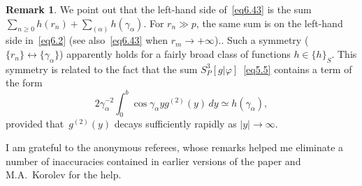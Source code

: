 \documentclass{amsart}
\theoremstyle{plain}
\theoremstyle{definition}
\newtheorem*{remark}{Remark}
\numberwithin{equation}{section}
\begin{document}
\begin{remark}
We point out that the left-hand side of~\eqref{eq6.43} is the sum
$\sum_{n\geqslant 0}h(r_n)+\sum_{(\alpha)}h(\gamma_\alpha)$. For
$r_n \gg p$, the same sum is on the left-hand side
in~\eqref{eq6.2} (see also~\eqref{eq6.43} when $r_{m}\to +\infty$).. Such a symmetry ($\{r_n\}\leftrightarrow
\{\gamma_\alpha\}$) apparently holds for a fairly broad class of
functions $h \in \{h\}_S$. This symmetry is related to the fact
that the sum $S_P^3[g|\varphi]$~\eqref{eq5.5} contains a term of
the form
$$
2\gamma_\alpha^{-2}\int_0^b \cos\gamma_\alpha yg^{(2)}(y)\,dy\simeq
h(\gamma_\alpha),
$$
provided that~$g^{(2)}(y)$ decays sufficiently rapidly as $|y|\to
\infty$.
\end{remark}

I am grateful to the anonymous referees, whose remarks helped me
eliminate a number of inaccuracies contained in earlier versions of
the paper and M.A.~Korolev for the help.
\end{document}
